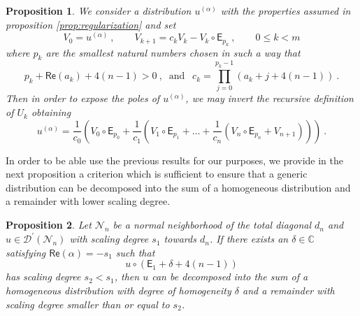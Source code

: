 \documentclass[11pt]{book}
\renewcommand{\Re}{\mathsf{Re}}
\newcommand{\Dcal}{\mathcal{D}}
\newcommand{\Ncal}{\mathcal{N}}
\newcommand{\Cbb}{\mathbb{C}}
\newcommand{\Esf}{\mathsf{E}}
\theoremstyle{break}
\newtheorem{proposition}{Proposition}[chapter]
\begin{document}
\begin{proposition}\label{prop:expose_poles}
We consider a distribution $u^{(\alpha)}$ with the properties assumed in proposition \ref{prop:regularization} and set
%
\begin{equation*}
V_0 = u^{(\alpha)} \ , \qquad V_{k+1} = c_k V_k - V_k \circ \Esf_{p_k} \ , \qquad 0 \leq k < m 
\end{equation*}
%
where $p_k$ are the smallest natural numbers chosen in such a way that 
%
\begin{equation*}
p_k+\Re(a_k)+4(n-1)>0 \ , \ \mbox{ and } \ \ c_k = \prod_{j=0}^{p_k-1} \left(a_k+j+4(n-1)\right) \ .
\end{equation*}
%
Then in order to expose the poles of $u^{(\alpha)}$, we may invert the recursive definition of $U_k$ obtaining
%
\begin{equation*}
u^{(\alpha)} = \frac{1}{c_0} \left( V_0\circ \Esf_{p_0} +  \frac{1}{c_1} \left( V_1 \circ \Esf_{p_1} +\dots + \frac{1}{c_n} \left( V_n \circ \Esf_{p_n} + V_{n+1} \right) \right) \right) \ .
\end{equation*}
%
\end{proposition}


In order to be able use the previous results for our purposes, we provide in the next proposition a criterion which is sufficient to ensure that a generic distribution can be decomposed into the sum of a homogeneous distribution and a remainder with lower scaling degree. 

\begin{proposition}\label{prop:set}
Let $\Ncal_n$ be a normal neighborhood of the total diagonal $d_n$ and $u \in \Dcal^\prime(\Ncal_n)$ with scaling degree $s_1$ towards $d_n$. If there exists an $\delta\in\Cbb$ satisfying $\Re(\alpha)=-s_1$ such that
%
\begin{equation*}
u\circ(\Esf_1+\delta+4(n-1)) 
\end{equation*}
%
has scaling degree $s_2 < s_1$, then $u$ can be decomposed into the sum of a homogeneous distribution with degree of homogeneity $\delta$ and a remainder with scaling degree smaller than or equal to $s_2$.
\end{proposition}
\end{document}
